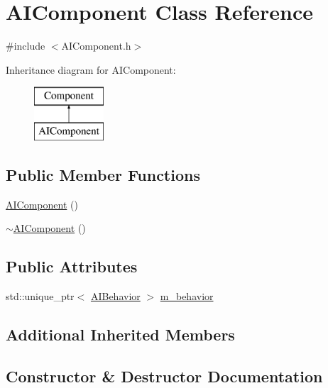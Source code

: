 \hypertarget{class_a_i_component}{}\section{A\+I\+Component Class Reference}
\label{class_a_i_component}


{\ttfamily \#include $<$A\+I\+Component.\+h$>$}

Inheritance diagram for A\+I\+Component\+:\begin{figure}[H]
\begin{center}
\leavevmode
\includegraphics[height=2.000000cm]{class_a_i_component}
\end{center}
\end{figure}
\subsection*{Public Member Functions}
\begin{DoxyCompactItemize}
\item 
\mbox{\hyperlink{class_a_i_component_ac0e093b9d74e3a103d93d843a1795a95}{A\+I\+Component}} ()
\item 
\mbox{\hyperlink{class_a_i_component_a0ffc6db0d1cb5720b8aaef8ec28f4efe}{$\sim$\+A\+I\+Component}} ()
\end{DoxyCompactItemize}
\subsection*{Public Attributes}
\begin{DoxyCompactItemize}
\item 
std\+::unique\+\_\+ptr$<$ \mbox{\hyperlink{class_a_i_behavior}{A\+I\+Behavior}} $>$ \mbox{\hyperlink{class_a_i_component_a39ced78aec7dc4cce01017ad2dfb06ea}{m\+\_\+behavior}}
\end{DoxyCompactItemize}
\subsection*{Additional Inherited Members}


\subsection{Constructor \& Destructor Documentation}
\mbox{\label{class_a_i_component_ac0e093b9d74e3a103d93d843a1795a95}} 
